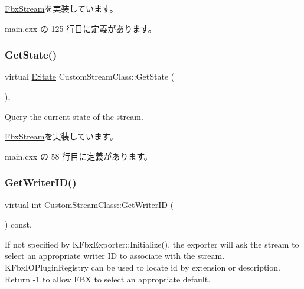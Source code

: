 \hyperlink{class_fbx_stream_ae2a7513a648cde508d00f5172ba2843d}{Fbx\+Stream}を実装しています。



 main.\+cxx の 125 行目に定義があります。

\mbox{\label{class_custom_stream_class_a75de6f5f3a8ea2d51a40ebfa34f20448}} 
\subsubsection{\texorpdfstring{Get\+State()}{GetState()}}
{\footnotesize\ttfamily virtual \hyperlink{class_fbx_stream_adc469d38eb30339fa4190eb6c66ec8f7}{E\+State} Custom\+Stream\+Class\+::\+Get\+State (\begin{DoxyParamCaption}{ }\end{DoxyParamCaption})\hspace{0.3cm}{\ttfamily [inline]}, {\ttfamily [virtual]}}

Query the current state of the stream. 

\hyperlink{class_fbx_stream_a602172d138a0fc5c4cb3443b2b925296}{Fbx\+Stream}を実装しています。



 main.\+cxx の 58 行目に定義があります。

\mbox{\label{class_custom_stream_class_a4fec56a5a7f65604c6e3eb2ce66fb3fb}} 
\subsubsection{\texorpdfstring{Get\+Writer\+I\+D()}{GetWriterID()}}
{\footnotesize\ttfamily virtual int Custom\+Stream\+Class\+::\+Get\+Writer\+ID (\begin{DoxyParamCaption}{ }\end{DoxyParamCaption}) const\hspace{0.3cm}{\ttfamily [inline]}, {\ttfamily [virtual]}}

If not specified by K\+Fbx\+Exporter\+::\+Initialize(), the exporter will ask the stream to select an appropriate writer ID to associate with the stream. K\+Fbx\+I\+O\+Plugin\+Registry can be used to locate id by extension or description. Return -\/1 to allow F\+BX to select an appropriate default. 

